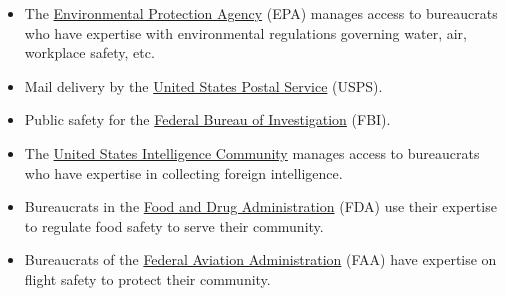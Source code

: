   \begin{itemize}
      \item The \href{https://en.wikipedia.org/wiki/United_States_Environmental_Protection_Agency}{Environmental Protection Agency} (EPA) manages access to bureaucrats who have expertise with environmental regulations governing water, air, workplace safety, etc.

      \item Mail delivery by the \href{https://en.wikipedia.org/wiki/United_States_Postal_Service}{United States Postal Service} (USPS).
%
\iftoggle{WPinmargin}{\marginpar{$>$Wikipedia: USPS}}{}

      \item Public safety for the \href{https://en.wikipedia.org/wiki/Federal_Bureau_of_Investigation}{Federal Bureau of Investigation} (FBI).
%
%

      \item The \href{https://www.intelligence.gov/}{United States Intelligence Community} manages access to bureaucrats who have expertise in collecting foreign intelligence.

      \item Bureaucrats in the \href{https://www.fda.gov/}{Food and Drug Administration} (FDA) use their expertise to regulate food safety to serve their community.


      \item Bureaucrats of the \href{https://www.faa.gov/}{Federal Aviation Administration} (FAA) have expertise on flight safety to protect their community.



\end{itemize}
